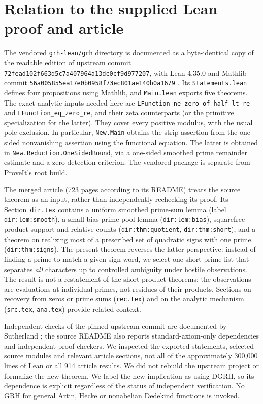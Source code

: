 \documentclass[11pt]{article}
\theoremstyle{remark}\newtheorem{remark}[theorem]{Remark}
\begin{document}
\section{Relation to the supplied Lean proof and article}
The vendored \texttt{grh-lean/grh} directory is documented as a byte-identical copy of the readable edition of upstream commit \texttt{72fead102f663d5c7a40}\allowbreak\texttt{7964a13dc0cf9d977207}, with Lean 4.35.0 and Mathlib commit \texttt{56a005855ea17e0b0958}\allowbreak\texttt{f73ec801ae140b0a1679} \cite{vendor}. Its \texttt{Statements.lean} defines four propositions using Mathlib, and \texttt{Main.lean} exports five theorems. The exact analytic inputs needed here are \texttt{LFunction\_ne\_zero\_}\allowbreak\texttt{of\_half\_lt\_re} and \texttt{LFunction\_eq\_zero\_re}, and their zeta counterparts (or the primitive specialization for the latter). They cover every positive modulus, with the usual pole exclusion. In particular, \texttt{New.Main} obtains the strip assertion from the one-sided nonvanishing assertion using the functional equation. The latter is obtained in \texttt{New.Reduction.}\allowbreak\texttt{OneSidedBound}, via a one-sided smoothed prime remainder estimate and a zero-detection criterion. The vendored package is separate from ProveIt's root build.

The merged article \cite{article} (723 pages according to its README) treats the source theorem as an input, rather than independently rechecking its proof. Its Section~\texttt{dir.tex} contains a uniform smoothed prime-sum lemma (label \texttt{dir:lem:smooth}), a small-bias prime pool lemma (\texttt{dir:lem:bias}), squarefree product support and relative counts (\texttt{dir:thm:quotient}, \texttt{dir:thm:short}), and a theorem on realizing most of a prescribed set of quadratic signs with one prime (\texttt{dir:thm:signs}). The present theorem reverses the latter perspective: instead of finding a prime to match a given sign word, we select one short prime list that separates \emph{all} characters up to controlled ambiguity under hostile observations. The result is not a restatement of the short-product theorems: the observations are evaluations at individual primes, not residues of their products. Sections on recovery from zeros or prime sums (\texttt{rec.tex}) and on the analytic mechanism (\texttt{src.tex}, \texttt{ana.tex}) provide related context.

Independent checks of the pinned upstream commit are documented by Sutherland \cite{sutherland}; the source README also reports standard-axiom-only dependencies and independent proof checkers. We inspected the exported statements, selected source modules and relevant article sections, not all of the approximately 300,000 lines of Lean or all 914 article results. We did not rebuild the upstream project or formalize the new theorem. We label the new implication as using DGRH, so its dependence is explicit regardless of the status of independent verification. No GRH for general Artin, Hecke or nonabelian Dedekind functions is invoked.
\end{document}
